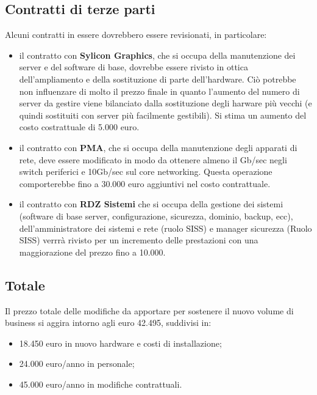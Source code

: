 \subsection{Contratti di terze parti}
Alcuni contratti in essere dovrebbero essere revisionati, in particolare:
\begin{itemize}
	\item il contratto con  \textbf{Sylicon Graphics}, che si occupa della manutenzione dei server e del software di base, dovrebbe essere rivisto in ottica dell'ampliamento e della sostituzione di parte dell'hardware. Ciò potrebbe non influenzare di molto il prezzo finale in quanto l'aumento del numero di server da gestire viene bilanciato dalla sostituzione degli harware più vecchi (e quindi sostituiti con server più facilmente gestibili). Si stima un aumento del costo costrattuale di 5.000 euro.
	\item il contratto con \textbf{PMA}, che si occupa della manutenzione degli apparati di rete, deve essere modificato in modo da ottenere almeno il Gb/sec  negli switch periferici e 10Gb/sec sul core networking. Questa operazione comporterebbe fino a 30.000 euro aggiuntivi nel costo contrattuale.
	\item il contratto con \textbf{RDZ Sistemi} che si occupa della gestione dei sistemi (software di base server, configurazione, sicurezza, dominio, backup, ecc), dell'amministratore dei sistemi e rete (ruolo SISS) e manager sicurezza (Ruolo SISS) verrrà rivisto per un incremento delle prestazioni con una maggiorazione del prezzo fino a 10.000.
\end{itemize}
\subsection*{Totale}
Il prezzo totale delle modifiche da apportare per sostenere il nuovo volume di business si aggira intorno agli euro 42.495, suddivisi in:
\begin{itemize}
		\item 18.450 euro in nuovo hardware e costi di installazione;
		\item 24.000 euro/anno in personale;
		\item 45.000 euro/anno in modifiche contrattuali.
\end{itemize}
